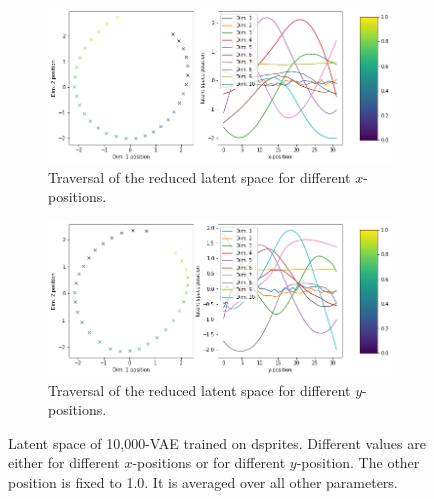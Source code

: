 \documentclass{beamer}
\begin{document}
\begin{frame}
\begin{figure}
\centering
\begin{subfigure}{.48\textwidth}
\includegraphics[width=\textwidth]{images/latent_space_traversals/vae_10000_dsprites_latent_space_values_x_position.png}
\caption{Traversal of the reduced latent space for different $x$-positions.}
\label{subfig:vae_dsprites_x_pos_latent_space_route}
\end{subfigure}
\begin{subfigure}{.48\textwidth}
\includegraphics[width=\textwidth]{images/latent_space_traversals/vae_10000_dsprites_latent_space_values_y_position.png}
\caption{Traversal of the reduced latent space for different $y$-positions.}
\label{subfig:vae_dsprites_y_pos_latent_space_route}
\end{subfigure}
\caption[VAE on dsprites: Latent Space Values]{Latent space of 10,000-VAE trained on dsprites. Different values are either for different $x$-positions or for different $y$-position. The other position is fixed to 1.0. It is averaged over all other parameters.}
\end{figure}
\end{frame}
\end{document}
